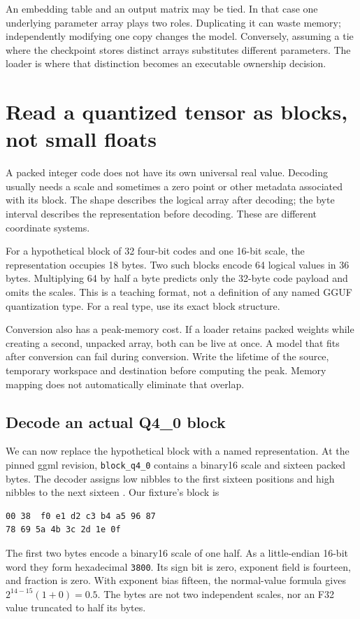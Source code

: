 An embedding table and an output matrix may be tied. In that case one
underlying parameter array plays two roles. Duplicating it can waste
memory; independently modifying one copy changes the model. Conversely,
assuming a tie where the checkpoint stores distinct arrays substitutes
different parameters. The loader is where that distinction becomes
an executable ownership decision.

\section{Read a quantized tensor as blocks, not small floats}
A packed integer code does not have its own universal real value.
Decoding usually needs a scale and sometimes a zero point or other
metadata associated with its block. The shape describes the logical
array after decoding; the byte interval describes the representation
before decoding. These are different coordinate systems.

For a hypothetical block of 32 four-bit codes and one 16-bit scale,
the representation occupies 18 bytes. Two such blocks encode 64
logical values in 36 bytes. Multiplying 64 by half a byte predicts
only the 32-byte code payload and omits the scales. This is a teaching
format, not a definition of any named GGUF quantization type.
For a real type, use its exact block structure.

Conversion also has a peak-memory cost. If a loader retains packed
weights while creating a second, unpacked array, both can be live at
once. A model that fits after conversion can fail during conversion.
Write the lifetime of the source, temporary workspace and destination
before computing the peak. Memory mapping does not automatically
eliminate that overlap.

\subsection{Decode an actual Q4\_0 block}
We can now replace the hypothetical block with a named representation.
At the pinned ggml revision, \texttt{block\_q4\_0} contains a binary16
scale and sixteen packed bytes. The decoder assigns low nibbles to
the first sixteen positions and high nibbles to the next sixteen
\cite{ggml2026q4pinned}. Our fixture's block is
\begin{verbatim}
00 38  f0 e1 d2 c3 b4 a5 96 87
78 69 5a 4b 3c 2d 1e 0f
\end{verbatim}
The first two bytes encode a binary16 scale of one half. As a
little-endian 16-bit word they form hexadecimal \texttt{3800}.
Its sign bit is zero, exponent field is fourteen, and fraction is
zero. With exponent bias fifteen, the normal-value formula gives
$2^{14-15}(1+0)=0.5$. The bytes are not two independent scales,
nor an F32 value truncated to half its bytes.

